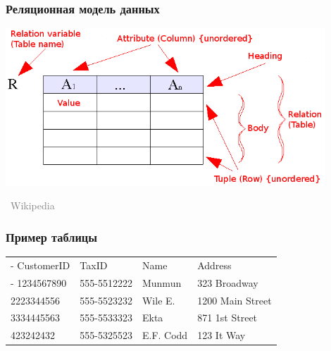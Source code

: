 \documentclass[xetex,mathserif,serif]{beamer}
\newcommand{\attribution}[1] {
\vspace{-5mm}\begin{flushright}\begin{scriptsize}\textcolor{gray}{\textcopyright\, #1}\end{scriptsize}\end{flushright}
}
\begin{document}
	\begin{frame}
		\frametitle{Реляционная модель данных}
		\begin{center}
			\includegraphics[width=0.9\textwidth]{relationalModel.png}
			\attribution{Wikipedia}
		\end{center}
	\end{frame}

	\begin{frame}
		\frametitle{Пример таблицы}
		\begin{center}
			\begin{tabu} {| X[0.9 l p] | X[1 l p] | X[1 l p] | X[1 l p] |}
				\tabucline-
				CustomerID       & TaxID        & Name       & Address           \\
				\tabucline-
				\everyrow{\tabucline-}
				1234567890       & 555-5512222  & Munmun     & 323 Broadway      \\
				2223344556       & 555-5523232  & Wile E.    & 1200 Main Street  \\
				3334445563       & 555-5533323  & Ekta       & 871 1st Street    \\
				423242432        & 555-5325523  & E.F. Codd  & 123 It Way        \\
			\end{tabu}
		\end{center}
	\end{frame}
\end{document}

